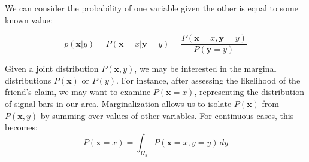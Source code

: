 We can consider the probability of one variable given the other is equal to some known value:

\[
    p(\bm{x}| y) = P(\bm{x} = x | \bm{y} = y) = \frac{P(\bm{x} = x, \bm{y} = y)}{P(\bm{y} = y)}
\]


Given a joint distribution \( P(\mathbf{x}, y) \), we may be interested in the marginal distributions \( P(\mathbf{x}) \) or \( P(y) \). For instance, after assessing the likelihood of the friend's claim, we may want to examine \( P(\mathbf{x} = x) \), representing the distribution of signal bars in our area. Marginalization allows us to isolate \( P(\mathbf{x}) \) from \( P(\mathbf{x}, y) \) by summing over values of other variables. For continuous cases, this becomes:
\[
P(\mathbf{x} = x) = \int_{\Omega_y} P(\mathbf{x} = x, y = y) \, dy
\]





